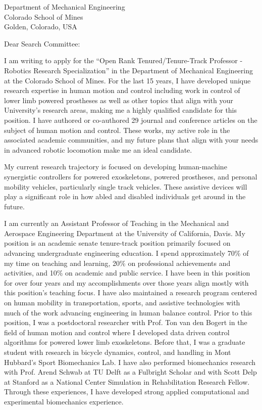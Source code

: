 \documentclass{letter}
\date{}
\begin{document}
\begin{letter}{
    Department of Mechanical Engineering \\
    Colorado School of Mines \\
    Golden, Colorado, USA
}

\opening{Dear Search Committee:}

I am writing to apply for the ``Open Rank Tenured/Tenure-Track Professor -
Robotics Research Specialization'' in the Department of Mechanical Engineering
at the Colorado School of Mines. For the last 15 years, I have developed unique
research expertise in human motion and control including work in control of
lower limb powered prostheses as well as other topics that align with your
University's research areas, making me a highly qualified candidate for this
position. I have authored or co-authored 29 journal and conference articles on
the subject of human motion and control. These works, my active role in the
associated academic communities, and my future plans that align with your needs
in advanced robotic locomotion make me an ideal candidate.

My current research trajectory is focused on developing human-machine
synergistic controllers for powered exoskeletons, powered prostheses, and
personal mobility vehicles, particularly single track vehicles. These assistive
devices will play a significant role in how abled and disabled individuals get
around in the future.

I am currently an Assistant Professor of Teaching in the Mechanical and
Aerospace Engineering Department at the University of California, Davis. My
position is an academic senate tenure-track position primarily focused on
advancing undergraduate engineering education. I spend approximately 70\% of my
time on teaching and learning, 20\% on professional achievements and
activities, and 10\% on academic and public service. I have been in this
position for over four years and my accomplishments over those years align
mostly with this position's teaching focus. I have also maintained a research
program centered on human mobility in transportation, sports, and assistive
technologies with much of the work advancing engineering in human balance
control. Prior to this position, I was a postdoctoral researcher with Prof. Ton
van den Bogert in the field of human motion and control where I developed data
driven control algorithms for powered lower limb exoskeletons. Before that, I
was a graduate student with research in bicycle dynamics, control, and handling
in Mont Hubbard's Sport Biomechanics Lab. I have also performed biomechanics
research with Prof. Arend Schwab at TU Delft as a Fulbright Scholar and with
Scott Delp at Stanford as a National Center Simulation in Rehabilitation
Research Fellow. Through these experiences, I have developed strong applied
computational and experimental biomechanics experience.


\end{letter}
\end{document}
